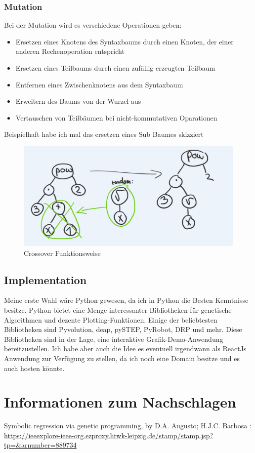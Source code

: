 \documentclass[ngerman]{article}
\begin{document}
\subsubsection{Mutation}
Bei der Mutation wird es verschiedene Operationen geben:
\begin{itemize}
	\item Ersetzen eines Knotens des Syntaxbaums durch einen Knoten, der einer anderen Rechenoperation entspricht
	\item Ersetzen eines Teilbaums durch einen zufällig erzeugten Teilbaum
\item Entfernen eines Zwischenknotens aus dem Syntaxbaum
\item Erweitern des Baums von der Wurzel aus
\item Vertauschen von Teilbäumen bei nicht-kommutativen Oparationen

\end{itemize}
Beispielhaft habe ich mal das ersetzen eines Sub Baumes skizziert


\begin{figure}[h]
	\centering
	\includegraphics[width=0.4\linewidth]{mutationswap.jpg}
	\caption{Crossover Funktionsweise}
	\label{fig::mut}
\end{figure}

\subsection{Implementation}
Meine erste Wahl wäre Python gewesen, da ich in Python die Besten Kenntnisse besitze. 
Python  bietet eine Menge interessanter Bibliotheken für genetische Algorithmen und dezente Plotting-Funktionen. Einige der beliebtesten Bibliotheken sind Pyvolution, deap, pySTEP, PyRobot, DRP und mehr. Diese Bibliotheken sind in der Lage, eine interaktive Grafik-Demo-Anwendung bereitzustellen.
Ich habe aber auch die Idee es eventuell irgendwann als ReactJs Anwendung zur Verfügung zu stellen, da ich noch eine Domain besitze und es auch hosten könnte.
\section{Informationen zum Nachschlagen}
Symbolic regression via genetic programming, by D.A. Augusto; H.J.C. Barbosa : 
\url{
	https://ieeexplore-ieee-org.ezproxy.htwk-leipzig.de/stamp/stamp.jsp?tp=&arnumber=889734}
\end{document}
